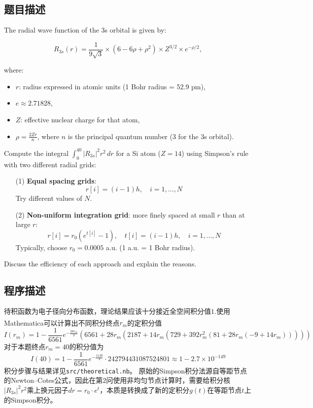 \subsection{题目描述}
\noindent The radial wave function of the 3s orbital is given by:

\[
R_{3s}(r) = \frac{1}{9\sqrt{3}} \times \left( 6 - 6 \rho + \rho^2 \right) \times Z^{3/2} \times e^{-\rho/2},
\]

where:
\begin{itemize}
    \item \( r \): radius expressed in atomic units (1 Bohr radius = 52.9 pm),
    \item \( e \approx 2.71828 \),
    \item \( Z \): effective nuclear charge for that atom,
    \item \( \rho = \frac{2 Z r}{n} \), where \( n \) is the principal quantum number (3 for the 3s orbital).
\end{itemize}

Compute the integral \( \int_0^{40} \left| R_{3s} \right|^2 r^2 \, dr \) for a Si atom (\( Z = 14 \)) using Simpson's rule with two different radial grids:

\begin{enumerate}
    \item[(1)] \textbf{Equal spacing grids}: 
    \[
    r[i] = (i - 1) h, \quad i = 1, \dots, N
    \]
    Try different values of \( N \).
    
    \item[(2)] \textbf{Non-uniform integration grid}: more finely spaced at small \( r \) than at large \( r \):
    \[
    r[i] = r_0(e^{t[i]} - 1), \quad t[i] = (i - 1) h, \quad i = 1, \dots, N
    \]
    Typically, choose \( r_0 = 0.0005 \) a.u. (1 a.u. = 1 Bohr radius).
\end{enumerate}

Discuss the efficiency of each approach and explain the reasons.

\subsection{程序描述}
待积函数为电子径向分布函数，理论结果应该十分接近全空间积分值$1.$使用Mathematica\textsuperscript{\textregistered}可以计算出不同积分终点$r_m$的定积分值
\[
    I(r_m) = 1 - \frac{1}{6561} e^{-\frac{28 r_m}{3}} \left( 6561 + 28 r_m \left( 2187 + 14 r_m \left( 729 + 392 r_m^2 \left( 81 + 28 r_m \left( -9 + 14 r_m \right) \right) \right) \right) \right)
\]
对于本题终点$r_m = 40$的积分值为
\[
I(40) = 1 - \frac{1}{6561} e^{-\frac{1120}{3}} \cdot 242794431087524801 \approx 1 - 2.7 \times 10^{-149}
\]
积分步骤与结果详见\texttt{src/theoretical.nb}。 
原始的Simpson积分法源自等距节点的Newton–Cotes公式，因此在第$2$问使用非均匀节点计算时，需要给积分核\(\left| R_{3s} \right|^2 r^2\)乘上换元因子\(dr = r_0 \cdot e^{t}\)，本质是转换成了新的定积分$g(t)$在等距节点$t$上的Simpson积分。

